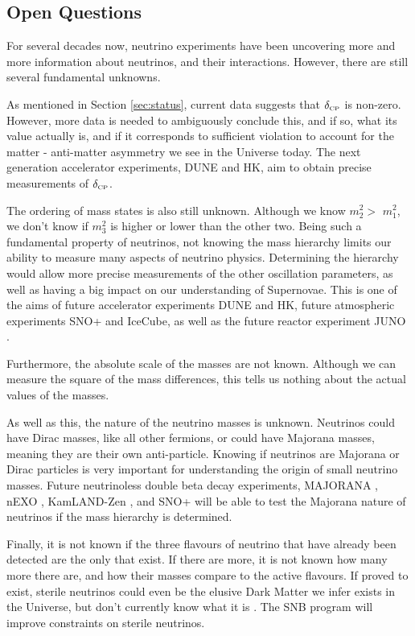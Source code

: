 \subsection{Open Questions}

For several decades now, neutrino experiments have been uncovering more and more information about neutrinos, and their interactions. However, there are still several fundamental unknowns. 

As mentioned in Section \ref{sec:status}, current data suggests that $\delta_{\scriptscriptstyle\mathrm{CP}}$ is non-zero. However, more data is needed to ambiguously conclude this, and if so, what its value actually is, and if it corresponds to sufficient \CP violation to account for the matter - anti-matter asymmetry we see in the Universe today. The next generation accelerator experiments, DUNE and HK, aim to obtain precise measurements of $\delta_{\scriptscriptstyle\mathrm{CP}}$.

The ordering of mass states is also still unknown. Although we know $m_{2}^2 >$ $m_{1}^2$, we don't know if $m_3^2$ is higher or lower than the other two. Being such a fundamental property of neutrinos, not knowing the mass hierarchy limits our ability to measure many aspects of neutrino physics. Determining the hierarchy would allow more precise measurements of the other oscillation parameters, as well as having a big impact on our understanding of Supernovae. This is one of the aims of future accelerator experiments DUNE and HK, future atmospheric experiments SNO+ and IceCube, as well as the future reactor experiment JUNO \cite{juno}.

Furthermore, the absolute scale of the masses are not known. Although we can measure the square of the mass differences, this tells us nothing about the actual values of the masses.

As well as this, the nature of the neutrino masses is unknown. Neutrinos could have Dirac masses, like all other fermions, or could have Majorana masses, meaning they are their own anti-particle. Knowing if neutrinos are Majorana or Dirac particles is very important for understanding the origin of small neutrino masses. Future neutrinoless double beta decay experiments, MAJORANA \cite{2011majorana}, nEXO \cite{nexo}, KamLAND-Zen \cite{kamlandzen}, and SNO+ will be able to test the Majorana nature of neutrinos if the mass hierarchy is determined.

Finally, it is not known if the three flavours of neutrino that have already been detected are the only that exist. If there are more, it is not known how many more there are, and how their masses compare to the active flavours. If proved to exist, sterile neutrinos could even be the elusive Dark Matter we infer exists in the Universe, but don't currently know what it is \cite{darkmatter}. The SNB program will improve constraints on sterile neutrinos.


